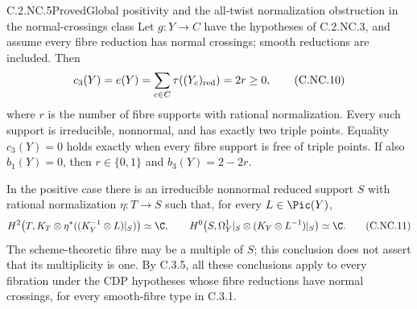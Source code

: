 \begin{statement}{C.2.NC.5}{Proved}{Global positivity and the all-twist normalization obstruction in the normal-crossings class}
Let $g:Y\to C$ have the hypotheses of C.2.NC.3, and assume every fibre reduction has normal crossings; smooth reductions are included. Then
\[
 c_3(Y)=e(Y)=\sum_{c\in C}\tau((Y_c)_{\rm red})=2r\ge0,
 \tag{C.NC.10}
\]
where $r$ is the number of fibre supports with rational normalization. Every such support is irreducible, nonnormal, and has exactly two triple points. Equality $c_3(Y)=0$ holds exactly when every fibre support is free of triple points. If also $b_1(Y)=0$, then $r\in\{0,1\}$ and $b_3(Y)=2-2r$.

In the positive case there is an irreducible nonnormal reduced support $S$ with rational normalization $\eta:T\to S$ such that, for every $L\in\Pic(Y)$,
\[
 H^2\!\left(T,K_T\otimes\eta^*((K_Y^{-1}\otimes L)|_S)\right)\simeq\C,
 \qquad
 H^0\!\left(S,\Omega_Y^1|_S\otimes(K_Y\otimes L^{-1})|_S\right)\simeq\C.
 \tag{C.NC.11}
\]
The scheme-theoretic fibre may be a multiple of $S$; this conclusion does not assert that its multiplicity is one. By C.3.5, all these conclusions apply to every fibration under the CDP hypotheses whose fibre reductions have normal crossings, for every smooth-fibre type in C.3.1.
\end{statement}

